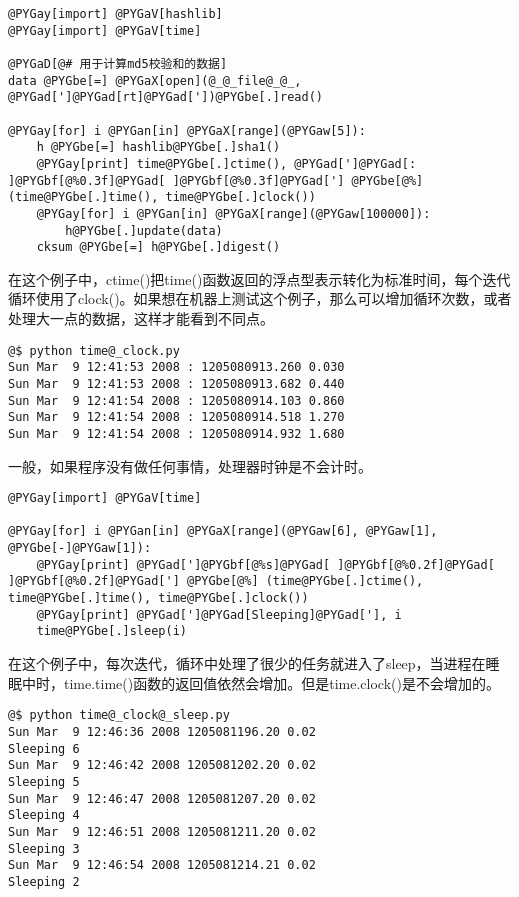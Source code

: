 \documentclass[a4paper,10pt,english]{manual}
\begin{document}
\begin{Verbatim}[commandchars=@\[\]]
@PYGay[import] @PYGaV[hashlib]
@PYGay[import] @PYGaV[time]

@PYGaD[@# 用于计算md5校验和的数据]
data @PYGbe[=] @PYGaX[open](@_@_file@_@_, @PYGad[']@PYGad[rt]@PYGad['])@PYGbe[.]read()

@PYGay[for] i @PYGan[in] @PYGaX[range](@PYGaw[5]):
    h @PYGbe[=] hashlib@PYGbe[.]sha1()
    @PYGay[print] time@PYGbe[.]ctime(), @PYGad[']@PYGad[: ]@PYGbf[@%0.3f]@PYGad[ ]@PYGbf[@%0.3f]@PYGad['] @PYGbe[@%] (time@PYGbe[.]time(), time@PYGbe[.]clock())
    @PYGay[for] i @PYGan[in] @PYGaX[range](@PYGaw[100000]):
        h@PYGbe[.]update(data)
    cksum @PYGbe[=] h@PYGbe[.]digest()
\end{Verbatim}

在这个例子中，ctime()把time()函数返回的浮点型表示转化为标准时间，每个迭代循环使用了clock()。如果想在机器上测试这个例子，那么可以增加循环次数，或者处理大一点的数据，这样才能看到不同点。

\begin{Verbatim}[commandchars=@\[\]]
@$ python time@_clock.py
Sun Mar  9 12:41:53 2008 : 1205080913.260 0.030
Sun Mar  9 12:41:53 2008 : 1205080913.682 0.440
Sun Mar  9 12:41:54 2008 : 1205080914.103 0.860
Sun Mar  9 12:41:54 2008 : 1205080914.518 1.270
Sun Mar  9 12:41:54 2008 : 1205080914.932 1.680
\end{Verbatim}

一般，如果程序没有做任何事情，处理器时钟是不会计时。

\begin{Verbatim}[commandchars=@\[\]]
@PYGay[import] @PYGaV[time]

@PYGay[for] i @PYGan[in] @PYGaX[range](@PYGaw[6], @PYGaw[1], @PYGbe[-]@PYGaw[1]):
    @PYGay[print] @PYGad[']@PYGbf[@%s]@PYGad[ ]@PYGbf[@%0.2f]@PYGad[ ]@PYGbf[@%0.2f]@PYGad['] @PYGbe[@%] (time@PYGbe[.]ctime(), time@PYGbe[.]time(), time@PYGbe[.]clock())
    @PYGay[print] @PYGad[']@PYGad[Sleeping]@PYGad['], i
    time@PYGbe[.]sleep(i)
\end{Verbatim}

在这个例子中，每次迭代，循环中处理了很少的任务就进入了sleep，当进程在睡眠中时，time.time()函数的返回值依然会增加。但是time.clock()是不会增加的。

\begin{Verbatim}[commandchars=@\[\]]
@$ python time@_clock@_sleep.py
Sun Mar  9 12:46:36 2008 1205081196.20 0.02
Sleeping 6
Sun Mar  9 12:46:42 2008 1205081202.20 0.02
Sleeping 5
Sun Mar  9 12:46:47 2008 1205081207.20 0.02
Sleeping 4
Sun Mar  9 12:46:51 2008 1205081211.20 0.02
Sleeping 3
Sun Mar  9 12:46:54 2008 1205081214.21 0.02
Sleeping 2
\end{Verbatim}
\end{document}
